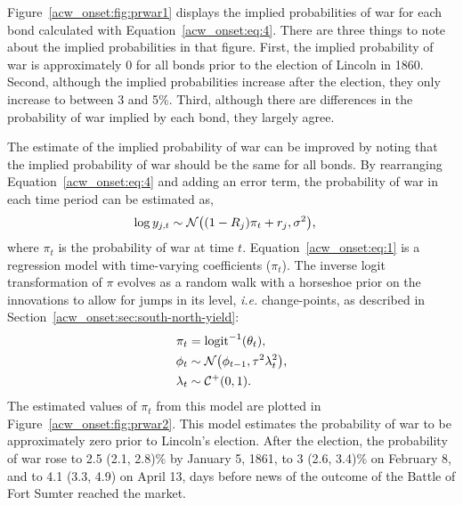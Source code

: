 Figure~\ref{acw_onset:fig:prwar1} displays the implied probabilities of war for each bond calculated with Equation~\eqref{acw_onset:eq:4}.
There are three things to note about the implied probabilities in that figure.
First, the implied probability of war is approximately 0 for all bonds prior to the election of Lincoln in 1860.
Second, although the implied probabilities increase after the election, they only increase to between 3 and 5\%.
Third, although there are differences in the probability of war implied by each bond, they largely agree.

The estimate of the implied probability of war can be improved by noting that the implied probability of war should be the same for all bonds.
By rearranging Equation~\eqref{acw_onset:eq:4} and adding an error term, the probability of war in each time period can be estimated as,
\begin{align}
  \label{acw_onset:eq:1}
  \log y_{j,t} & \sim \mathcal{N}\mathopen{}\left((1 - R_{j}) \pi_{t} + r_{j}, \sigma^{2}\right)\mathclose{} \text{,}
\end{align}
where $\pi_{t}$ is the probability of war at time $t$.
Equation~\eqref{acw_onset:eq:1} is a regression model with time-varying coefficients ($\pi_{t}$).
The inverse logit transformation of $\pi$ evolves as a random walk with a horseshoe prior on the innovations to allow for jumps in its level, \textit{i.e.} change-points, as described in Section~\ref{acw_onset:sec:south-north-yield}:
\begin{align}
  \pi_{t} &= \operatorname{logit}^{-1}(\theta_{t}) \text{,} \\
  \phi_{t} &\sim \mathcal{N}\mathopen{}\left(\phi_{t-1}, \tau^{2} \lambda_{t}^{2}\right)\mathclose{} \text{,} \\
  \lambda_{t} &\sim \mathcal{C^+}\mathopen{}\left(0, 1\right)\mathclose{} \text{.}
\end{align}
The estimated values of $\pi_{t}$ from this model are plotted in Figure~\ref{acw_onset:fig:prwar2}.
This model estimates the probability of war to be approximately zero prior to Lincoln's election.
After the election, the probability of war rose to 2.5 (2.1, 2.8)\% by January 5, 1861,
to 3 (2.6, 3.4)\% on February 8, and to 4.1 (3.3, 4.9) on April 13, days before news of the outcome of the Battle of Fort Sumter reached the market.

